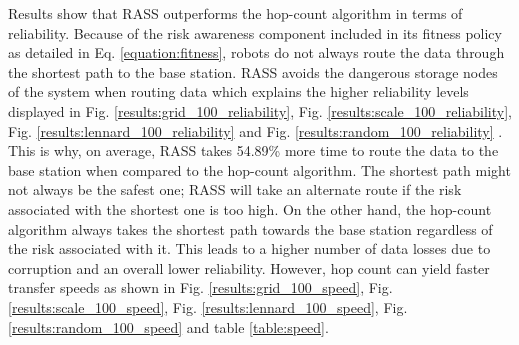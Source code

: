 Results show that \ac{RASS} outperforms the hop-count algorithm in terms of reliability. Because 
of the risk awareness component included in its fitness policy as detailed in Eq. 
\ref{equation:fitness}, robots do not always route the data through the shortest path to 
the base station. \ac{RASS} avoids the dangerous storage nodes of the system when routing data 
which explains the higher reliability levels displayed in Fig. 
\ref{results:grid_100_reliability}, Fig. \ref{results:scale_100_reliability}, Fig. 
\ref{results:lennard_100_reliability} and Fig. \ref{results:random_100_reliability} . This 
is why, on average, \ac{RASS} takes 54.89\% more time to route the data to the base station when 
compared to the hop-count algorithm. The shortest path might not always be the safest one; 
\ac{RASS} will take an alternate route if the risk associated with the shortest one is too high. 
On the other hand, the hop-count algorithm always takes the shortest path towards the base 
station regardless of the risk associated with it. This leads to a higher number of data 
losses due to corruption and an overall lower reliability.
However, hop count can yield faster transfer speeds as shown in Fig. \ref{results:grid_100_speed}, Fig. \ref{results:scale_100_speed}, Fig. \ref{results:lennard_100_speed}, Fig. \ref{results:random_100_speed} and table \ref{table:speed}.

